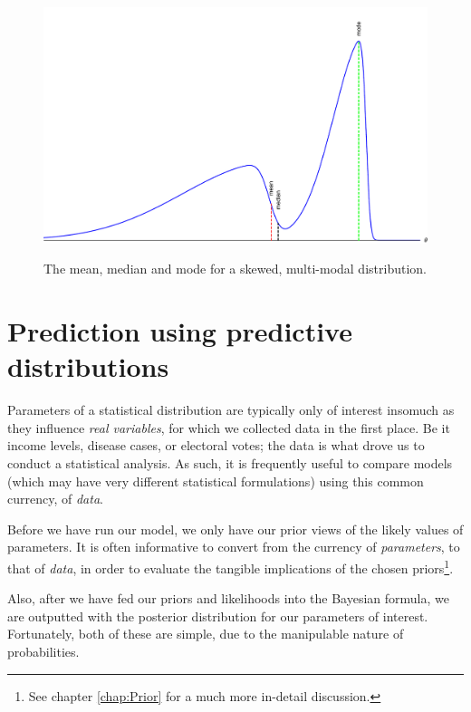 \documentclass[11pt,fullpage]{book}
\begin{document}
\begin{figure}
\centering
\scalebox{0.4} 
{\includegraphics{Posterior_meanMedianMAP.pdf}}
\caption{The mean, median and mode for a skewed, multi-modal distribution.}\label{fig:Posterior_meanMedianMAP}
\end{figure}


\section{Prediction using predictive distributions}
Parameters of a statistical distribution are typically only of interest insomuch as they influence \textit{real variables}, for which we collected data in the first place. Be it income levels, disease cases, or electoral votes; the data is what drove us to conduct a statistical analysis. As such, it is frequently useful to compare models (which may have very different statistical formulations) using this common currency, of \textit{data}.

Before we have run our model, we only have our prior views of the likely values of parameters. It is often informative to convert from the currency of \textit{parameters}, to that of \textit{data}, in order to evaluate the tangible implications of the chosen priors\footnote{See chapter \ref{chap:Prior} for a much more in-detail discussion.}.

Also, after we have fed our priors and likelihoods into the Bayesian formula, we are outputted with the posterior distribution for our parameters of interest. Fortunately, both of these are simple, due to the manipulable nature of probabilities.
\end{document}

